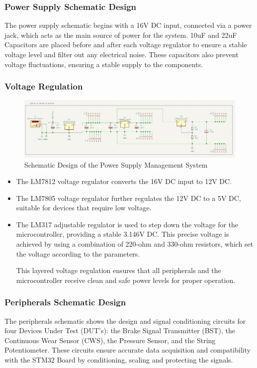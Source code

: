 \documentclass[12pt]{article}
\begin{document}
\subsubsection{Power Supply Schematic Design}
The power supply schematic begins with a 16V DC input, connected via a power
jack, which acts as the main source of power for the system. 10uF and 22uF
Capacitors are placed before and after each voltage regulator to ensure a
stable voltage level and filter out any electrical noise. These capacitors also
prevent voltage fluctuations, ensuring a stable supply to the components.
\break
\subsubsection*{Voltage Regulation}
  \begin{figure}[H]
    \includegraphics[width=\textwidth]{../assets/pcb/image1.jpg}
    \caption{Schematic Design of the Power Supply Management System}
  \end{figure}
\begin{itemize}
  \item The LM7812 voltage regulator converts the 16V DC input to 12V DC.
  \item The LM7805 voltage regulator further regulates the 12V DC to a 5V DC,
    suitable for devices that require low voltage.
  \item The LM317 adjustable regulator is used to step down the voltage for the
    microcontroller, providing a stable 3.146V DC. This precise voltage is
    achieved by using a combination of 220-ohm and 330-ohm resistors, which set
    the voltage according to the parameters.

    This layered voltage regulation ensures that all peripherals and the
    microcontroller receive clean and safe power levels for proper operation.
\end{itemize}

\subsubsection{Peripherals Schematic Design}
The peripherals schematic shows the design and signal conditioning circuits for
four Devices Under Test (DUT’s): the Brake Signal Transmitter (BST), the
Continuous Wear Sensor (CWS), the Pressure Sensor, and the String
Potentiometer. These circuits ensure accurate data acquisition and
compatibility with the STM32 Board by conditioning, scaling and protecting the
signals.
\end{document}
